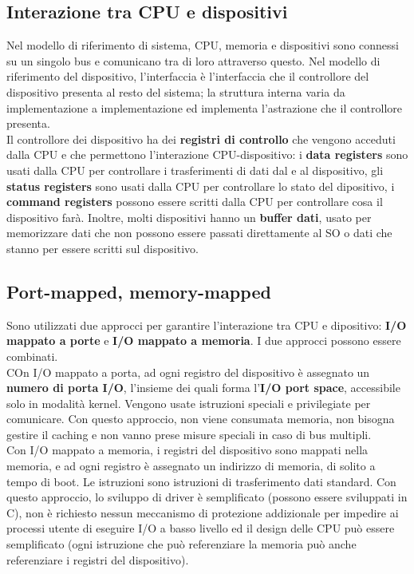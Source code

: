 \documentclass[12pt]{article}
\begin{document}
\subsection{Interazione tra CPU e dispositivi}
Nel modello di riferimento di sistema, CPU, memoria e dispositivi sono connessi su un singolo bus e comunicano tra di loro 
attraverso questo. Nel modello di riferimento del dispositivo, l'interfaccia è l'interfaccia che il controllore del dispositivo 
presenta al resto del sistema; la struttura interna varia da implementazione a implementazione ed implementa l'astrazione 
che il controllore presenta.\\
Il controllore dei dispositivo ha dei \textbf{registri di controllo} che vengono acceduti dalla CPU e che permettono l'interazione 
CPU-dispositivo: i \textbf{data registers} sono usati dalla CPU per controllare i trasferimenti di dati dal e al dispositivo, 
gli \textbf{status registers} sono usati dalla CPU per controllare lo stato del dipositivo, i \textbf{command registers} 
possono essere scritti dalla CPU per controllare cosa il dispositivo farà. Inoltre, molti dispositivi hanno un \textbf{buffer dati}, 
usato per memorizzare dati che non possono essere passati direttamente al SO o dati che stanno per essere scritti sul 
dispositivo.
\subsection{Port-mapped, memory-mapped}
Sono utilizzati due approcci per garantire l'interazione tra CPU e dipositivo: \textbf{I/O mappato a porte} e \textbf{I/O mappato a memoria}.
I due approcci possono essere combinati.\\
COn I/O mappato a porta, ad ogni registro del dispositivo è assegnato un \textbf{numero di porta I/O}, l'insieme dei quali forma l'\textbf{I/O port 
space}, accessibile solo in modalità kernel. Vengono usate istruzioni speciali e privilegiate per comunicare. Con questo 
approccio, non viene consumata memoria, non bisogna gestire il caching e non vanno prese misure speciali in caso di bus 
multipli.\\
Con I/O mappato a memoria, i registri del dispositivo sono mappati nella memoria, e ad ogni registro è assegnato un indirizzo 
di memoria, di solito a tempo di boot. Le istruzioni sono istruzioni di trasferimento dati standard. Con questo approccio, 
lo sviluppo di driver è semplificato (possono essere sviluppati in C), non è richiesto nessun meccanismo di protezione 
addizionale per impedire ai processi utente di eseguire I/O a basso livello ed il design delle CPU può essere semplificato 
(ogni istruzione che può referenziare la memoria può anche referenziare i registri del dispositivo).
\end{document}
